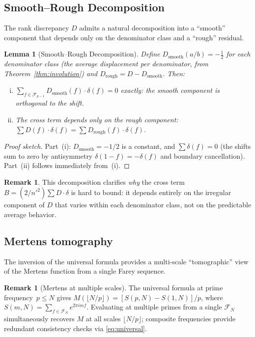 \documentclass[11pt]{article}
\newtheorem{lemma}[theorem]{Lemma}
\theoremstyle{definition}
\newtheorem{remark}[theorem]{Remark}
\newcommand{\F}{\mathcal{F}}
\begin{document}
\subsection{Smooth--Rough Decomposition}

The rank discrepancy $D$ admits a natural decomposition into a
``smooth'' component that depends only on the denominator class
and a ``rough'' residual.

\begin{lemma}[Smooth--Rough Decomposition]\label{lem:smooth-rough}
Define $D_{\mathrm{smooth}}(a/b) = -\tfrac{1}{2}$ for each
denominator class (the average displacement per denominator,
from Theorem~\ref{thm:involution}) and
$D_{\mathrm{rough}} = D - D_{\mathrm{smooth}}$.
Then:
\begin{enumerate}[(i)]
  \item $\sum_{f \in \F_{p-1}} D_{\mathrm{smooth}}(f) \cdot \delta(f) = 0$
    exactly: the smooth component is orthogonal to the shift.
  \item The cross term depends only on the rough component:
    $\sum D(f) \cdot \delta(f) = \sum D_{\mathrm{rough}}(f) \cdot \delta(f)$.
\end{enumerate}
\end{lemma}

\begin{proof}[Proof sketch]
Part~(i): $D_{\mathrm{smooth}} = -1/2$ is a constant, and
$\sum \delta(f) = 0$ (the shifts sum to zero by antisymmetry
$\delta(1-f) = -\delta(f)$ and boundary cancellation).
Part~(ii) follows immediately from~(i).
\end{proof}

\begin{remark}
This decomposition clarifies \emph{why} the cross term
$B = (2/n'^2)\sum D \cdot \delta$ is hard to bound:
it depends entirely on the irregular component of $D$
that varies within each denominator class, not on the
predictable average behavior.
\end{remark}

\subsection{Mertens tomography}

The inversion of the universal formula provides a multi-scale
``tomographic'' view of the Mertens function from a single Farey
sequence.

\begin{remark}[Mertens at multiple scales]
The universal formula at prime frequency~$p \le N$ gives
$M(\lfloor N/p \rfloor) = [S(p,N) - S(1,N)]/p$,
where $S(m,N) = \sum_{f \in \F_N} e^{2\pi imf}$.
Evaluating at multiple primes from a single $\F_N$ simultaneously
recovers $M$ at all scales $\lfloor N/p \rfloor$; composite
frequencies provide redundant consistency checks via
\eqref{eq:universal}.
\end{remark}
\end{document}
